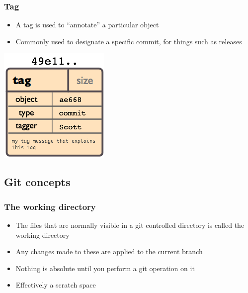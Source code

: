 \documentclass{beamer}
\begin{document}
\begin{frame}
  \frametitle{Tag}
  \begin{itemize}
    \item A tag is used to ``annotate'' a particular object
    \item Commonly used to designate a specific commit, for things such as releases
  \end{itemize}
  \includegraphics[scale = .7]{images/object-tag.png}
\end{frame}


\subsection{Git concepts}

\begin{frame}
  \frametitle{The working directory}
  \begin{itemize}
    \item The files that are normally visible in a git controlled directory is called the working directory
    \item Any changes made to these are applied to the current branch
    \item Nothing is absolute until you perform a git operation on it
    \item Effectively a scratch space
  \end{itemize}
\end{frame}
\end{document}
